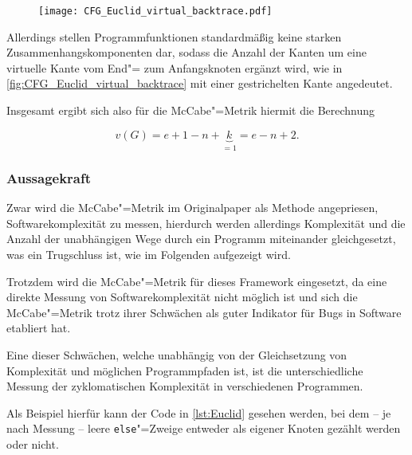                 \begin{figure}[htp]
                    \centering%
                    \texttt{[image: CFG\_Euclid\_virtual\_backtrace.pdf]}
                    \label{fig:CFG_Euclid_virtual_backtrace}
                \end{figure}

                Allerdings stellen Programmfunktionen standardmäßig keine starken Zusammenhangskomponenten dar,
                sodass die Anzahl der Kanten um eine virtuelle Kante vom End"= zum Anfangsknoten ergänzt wird,
                wie in
                \vref{fig:CFG_Euclid_virtual_backtrace} mit einer gestrichelten Kante angedeutet.

                Insgesamt ergibt sich also für die McCabe"=Metrik hiermit die Berechnung

                \[ v(G) = e + 1 - n + \underbrace{k}_{= 1} = e - n + 2. \]

            \subsubsection{Aussagekraft}\label{Aussagekraft}
                Zwar wird die McCabe"=Metrik im Originalpaper als Methode angepriesen,
                Softwarekomplexität zu messen,\cite[5]{Watson1996}
                hierdurch werden allerdings Komplexität und
                die Anzahl der unabhängigen Wege durch ein Programm miteinander gleichgesetzt,
                was ein Trugschluss ist,
                wie im Folgenden aufgezeigt wird.

                Trotzdem wird die McCabe"=Metrik für dieses Framework eingesetzt,
                da eine direkte Messung von Softwarekomplexität nicht möglich ist und
                sich die McCabe"=Metrik trotz ihrer Schwächen als guter Indikator für Bugs in Software etabliert hat.\cite[123]{Watson1996}

                Eine dieser Schwächen,
                welche unabhängig von der Gleichsetzung von Komplexität und
                möglichen Programmpfaden ist,
                ist die unterschiedliche Messung der zyklomatischen Komplexität in verschiedenen Programmen.

                Als Beispiel hierfür kann der Code in
                \vref{lst:Euclid} gesehen werden,
                bei dem
                -- je nach Messung
                -- leere
                \lstinline{else}"=Zweige entweder als eigener Knoten gezählt werden oder
                nicht.

